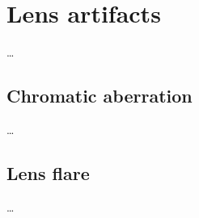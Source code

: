 \chapter{Lens artifacts}
\label{ch:Content2}
\dots
\section{Chromatic aberration}
\label{ch:Content2:sec:Section1}

\dots

\section{Lens flare}
\label{ch:Content2:sec:Section2}

\dots